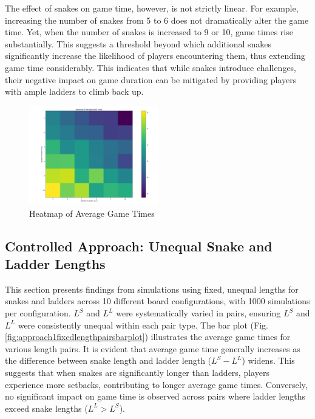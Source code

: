 The effect of snakes on game time, however, is not strictly linear. For example, increasing the number of snakes from 5 to 6 does not dramatically alter the game time. Yet, when the number of snakes is increased to 9 or 10, game times rise substantially. This suggests a threshold beyond which additional snakes significantly increase the likelihood of players encountering them, thus extending game time considerably. This indicates that while snakes introduce challenges, their negative impact on game duration can be mitigated by providing players with ample ladders to climb back up.

\begin{figure}[th]
	\centering
	\includegraphics[width=0.5\textwidth]{"../Chapter 1/Heatmap"}
	\caption{Heatmap of Average Game Times}
	\label{fig:heatmap}
\end{figure}


\subsection{Controlled Approach: Unequal Snake and Ladder Lengths}

This section presents findings from simulations using fixed, unequal lengths for snakes and ladders across 10 different board configurations, with 1000 simulations per configuration. $L^S$ and $L^L$ were  systematically varied in pairs, ensuring $L^S$ and $L^L$ were consistently unequal within each pair type. The bar plot (Fig. \ref{fig:approach1fixedlengthpairsbarplot}) illustrates the average game times for various length pairs. It is evident that average game time generally increases as the difference between snake length and ladder length ($L^S - L^L$) widens. This suggests that when snakes are significantly longer than ladders, players experience more setbacks, contributing to longer average game times. Conversely, no significant impact on game time is observed across pairs where ladder lengths exceed snake lengths ($L^L > L^S$).

